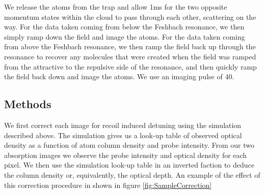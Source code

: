 \documentclass[12pt]{iopart}
\begin{document}
\par We release the atoms from the trap and allow 1ms for the two opposite momentum states within the cloud to pass through each other, scattering on the way. For the data taken coming from below the Feshbach resonance, we then simply ramp down the field and image the atoms. For the data taken coming from above the Feshbach resonance, we then ramp the field back up through the resonance to recover any molecules that were created when the field was ramped from the attractive to the repulsive side of the resonance, and then quickly ramp the field back down and image the atoms. We use an imaging pulse of 40\us{}.
\subsection{Methods}
We first correct each image for recoil induced detuning using the simulation described above. The simulation gives us a look-up table of observed optical density as a function of atom column density and probe intensity. From our two absorption images we observe the probe intensity and optical density for each pixel. We then use the simulation look-up table in an inverted faction to deduce the column density or, equivalently, the optical depth. An example of the effect of this correction procedure in shown in figure \ref{fig:SampleCorrection}
\end{document}

